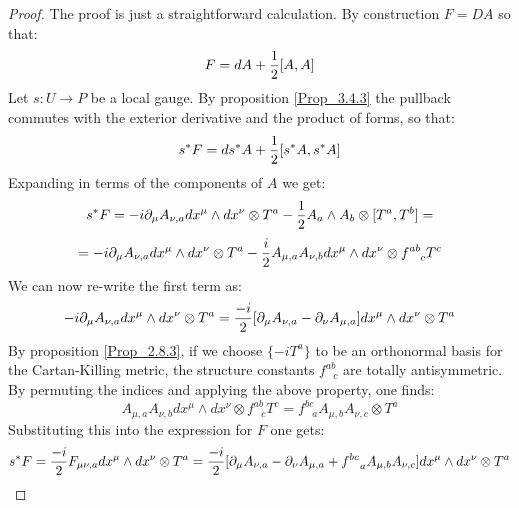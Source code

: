 \documentclass[12pt,a4paper]{report}
\theoremstyle{definition}
\theoremstyle{Theorem}
\theoremstyle{definition}
\theoremstyle{definition}
\begin{document}
	\begin{proof}
		The proof is just a straightforward calculation. By construction $F=DA$ so that:
		$$F=dA+{1\over 2}[A,A]$$
		Let $s:U\rightarrow P$ be a local gauge. By proposition \ref{Prop_3.4.3} the pullback commutes with the exterior derivative and the product of forms, so that:
		$$s^*F=ds^*A+{1\over 2}[s^*A,s^*A]$$
		Expanding in terms of the components of $A$ we get:
		$$s^*F=-i\partial_\mu A_{\nu,a}dx^\mu\wedge dx^\nu\otimes T^a-{1\over 2}A_a\wedge A_b\otimes [T^a,T^b]=$$
		$$=-i\partial_\mu A_{\nu,a}dx^\mu\wedge dx^\nu\otimes T^a-{i\over 2}A_{\mu,a}A_{\nu,b}dx^\mu\wedge dx^\nu \otimes f^{ab}_{\hspace{9pt}c}T^c$$
		We can now re-write the first term as:
		$$-i\partial_\mu A_{\nu,a}dx^\mu\wedge dx^\nu\otimes T^a={-i\over 2}[\partial_\mu A_{\nu,a}-\partial_\nu A_{\mu,a}]dx^\mu\wedge dx^\nu\otimes T^a$$
		By proposition \ref{Prop_2.8.3}, if we choose $\{-iT^a\}$ to be an orthonormal basis for the Cartan-Killing metric, the structure constants $f^{ab}_{\hspace{9pt}c}$ are totally antisymmetric. By permuting the indices and applying the above property, one finds:
		$$A_{\mu,a}A_{\nu,b}dx^\mu\wedge dx^\nu \otimes f^{ab}_{\hspace{9pt}c}T^c=f^{bc}_{\hspace{9pt}a}A_{\mu,b}A_{\nu,c}\otimes T^a$$
		Substituting this into the expression for $F$ one gets:
		$$s^*F={-i\over 2}F_{\mu\nu,a}dx^\mu\wedge dx^\nu\otimes T^a={-i\over 2}[\partial_{\mu}A_{\nu,a}-\partial_{\nu}A_{\mu,a}+f^{bc}_{\hspace{9pt}a}A_{\mu,b}A_{\nu,c}]dx^\mu\wedge dx^\nu \otimes T^a$$
	\end{proof}
\end{document}
